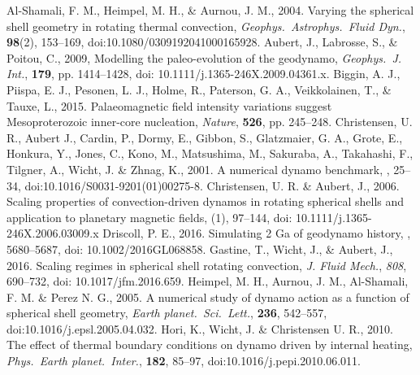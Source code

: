 \begin{thebibliography}{}
%
Al-Shamali, F. M., Heimpel, M. H., \& Aurnou, J. M., 2004. Varying the spherical shell geometry in rotating thermal convection, {\it Geophys.\  Astrophys.\ Fluid Dyn.}, {\bf 98}(2), 153--169, doi:10.1080/0309192041000165928.
%
Aubert, J., Labrosse, S., \& Poitou, C., 2009, Modelling the paleo-evolution of the geodynamo, {\it Geophys.\ J. Int.}, {\bf 179}, pp. 1414--1428, doi: 10.1111/j.1365-246X.2009.04361.x.
%
Biggin, A. J., Piispa, E. J., Pesonen, L. J., Holme, R., Paterson, G. A., Veikkolainen, T., \& Tauxe, L., 2015. Palaeomagnetic field intensity variations suggest Mesoproterozoic inner-core nucleation, {\it Nature}, {\bf 526}, pp. 245–248.
%
Christensen, U. R., Aubert J., Cardin, P., Dormy, E., Gibbon, S., Glatzmaier, G. A., Grote, E., Honkura, Y., Jones, C., Kono, M., Matsushima, M., Sakuraba, A., Takahashi, F., Tilgner, A., Wicht, J. \& Zhnag, K., 2001. A numerical dynamo benchmark, , 25--34, doi:10.1016/S0031-9201(01)00275-8.
%
Christensen, U. R. \& Aubert, J., 2006. Scaling properties of convection-driven dynamos in rotating spherical shells and application to planetary magnetic fields, (1), 97--144, doi: 10.1111/j.1365-246X.2006.03009.x
%
Driscoll, P. E., 2016. Simulating 2 Ga of geodynamo history, , 5680--5687, doi: 10.1002/2016GL068858.
%
{\color{red}
Gastine, T., Wicht, J., \& Aubert, J., 2016. Scaling regimes in spherical shell rotating convection, {\it J. Fluid Mech.}, {\it 808}, 690--732, doi: 10.1017/jfm.2016.659.
}
%
Heimpel, M. H., Aurnou, J. M., Al-Shamali, F. M. \& Perez N. G., 2005. A numerical study of dynamo action as a function of spherical shell geometry, {\it Earth planet.\ Sci.\ Lett.}, {\bf 236}, 542--557, doi:10.1016/j.epsl.2005.04.032.
%
Hori, K., Wicht, J. \& Christensen U. R., 2010. The effect of thermal boundary conditions on dynamo driven by internal heating, {\it Phys.\ Earth planet.\ Inter.}, {\bf 182}, 85--97, doi:10.1016/j.pepi.2010.06.011.

\end{thebibliography}

